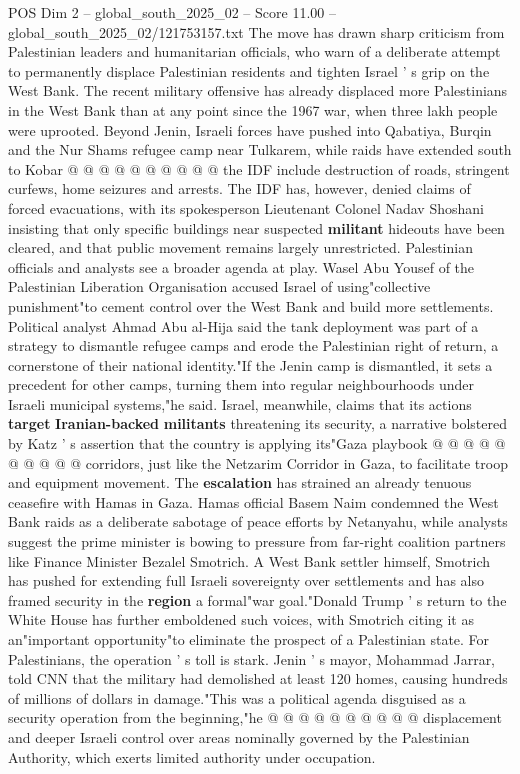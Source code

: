 \begin{textsample}{POS Dim 2 – global\_south\_2025\_02 – Score 11.00 – global\_south\_2025\_02/121753157.txt}
The move has drawn sharp criticism from Palestinian leaders and humanitarian officials, who warn of a deliberate attempt to permanently displace Palestinian residents and tighten Israel ' s grip on the West Bank.
The recent military offensive has already displaced more Palestinians in the West Bank than at any point since the 1967 war, when three lakh people were uprooted.
Beyond Jenin, Israeli forces have pushed into Qabatiya, Burqin and the Nur Shams refugee camp near Tulkarem, while raids have extended south to Kobar @ @ @ @ @ @ @ @ @ @ the IDF include destruction of roads, stringent curfews, home seizures and arrests.
The IDF has, however, denied claims of forced evacuations, with its spokesperson Lieutenant Colonel Nadav Shoshani insisting that only specific buildings near suspected \textbf{militant} hideouts have been cleared, and that public movement remains largely unrestricted.
Palestinian officials and analysts see a broader agenda at play.
Wasel Abu Yousef of the Palestinian Liberation Organisation accused Israel of using"collective punishment"to cement control over the West Bank and build more settlements.
Political analyst Ahmad Abu al-Hija said the tank deployment was part of a strategy to dismantle refugee camps and erode the Palestinian right of return, a cornerstone of their national identity."If the Jenin camp is dismantled, it sets a precedent for other camps, turning them into regular neighbourhoods under Israeli municipal systems,"he said.
Israel, meanwhile, claims that its actions \textbf{target} \textbf{Iranian-backed} \textbf{militants} threatening its security, a narrative bolstered by Katz ' s assertion that the country is applying its"Gaza playbook @ @ @ @ @ @ @ @ @ @ corridors, just like the Netzarim Corridor in Gaza, to facilitate troop and equipment movement.
The \textbf{escalation} has strained an already tenuous ceasefire with Hamas in Gaza.
Hamas official Basem Naim condemned the West Bank raids as a deliberate sabotage of peace efforts by Netanyahu, while analysts suggest the prime minister is bowing to pressure from far-right coalition partners like Finance Minister Bezalel Smotrich.
A West Bank settler himself, Smotrich has pushed for extending full Israeli sovereignty over settlements and has also framed security in the \textbf{region} a formal"war goal."Donald Trump ' s return to the White House has further emboldened such voices, with Smotrich citing it as an"important opportunity"to eliminate the prospect of a Palestinian state.
For Palestinians, the operation ' s toll is stark.
Jenin ' s mayor, Mohammad Jarrar, told CNN that the military had demolished at least 120 homes, causing hundreds of millions of dollars in damage."This was a political agenda disguised as a security operation from the beginning,"he @ @ @ @ @ @ @ @ @ @ displacement and deeper Israeli control over areas nominally governed by the Palestinian Authority, which exerts limited authority under occupation.

\end{textsample}
